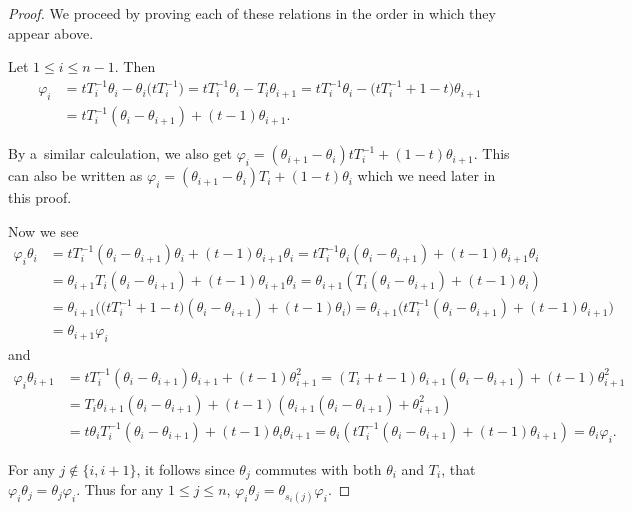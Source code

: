\documentclass[pdftex]{sigma}
\numberwithin{equation}{section}
\theoremstyle{definition}
\begin{document}
\begin{proof}
We proceed by proving each of these relations in the order in which they appear above.

 Let $1 \leq i \leq n-1$. Then
\begin{align*}
 \varphi_i &= tT_i^{-1}\theta_i - \theta_i\bigl(tT_i^{-1}\bigr) = tT_i^{-1}\theta_i - T_i\theta_{i+1} = tT_i^{-1}\theta_i - \bigl(tT_i^{-1}+1-t\bigr)\theta_{i+1}\\
 &= tT_i^{-1}(\theta_i - \theta_{i+1}) + (t-1)\theta_{i+1}.
\end{align*}

By a~similar calculation, we also get
$ \varphi_i = (\theta_{i+1}-\theta_i)tT_i^{-1} + (1-t)\theta_{i+1}$.
This can also be written as
$ \varphi_i = (\theta_{i+1}-\theta_i)T_i + (1-t)\theta_i
$
which we need later in this proof.

Now we see
\begin{align*}
 \varphi_i\theta_i &= tT_i^{-1}(\theta_i-\theta_{i+1})\theta_i + (t-1)\theta_{i+1}\theta_i = tT_i^{-1}\theta_i(\theta_i-\theta_{i+1}) + (t-1)\theta_{i+1}\theta_i \\
 & = \theta_{i+1}T_i(\theta_i -\theta_{i+1}) + (t-1)\theta_{i+1}\theta_i
 = \theta_{i+1}( T_i(\theta_i-\theta_{i+1}) + (t-1)\theta_i ) \\
 & = \theta_{i+1}\bigl( \bigl(tT_i^{-1} + 1-t\bigr)(\theta_i -\theta_{i+1}) + (t-1)\theta_i \bigr) = \theta_{i+1} \bigl( tT_i^{-1}(\theta_i -\theta_{i+1}) + (t-1)\theta_{i+1}\bigr) \\
&= \theta_{i+1}\varphi_i
\end{align*}
and
\begin{align*}
 \varphi_i\theta_{i+1} &= tT_i^{-1}(\theta_i - \theta_{i+1})\theta_{i+1}+(t-1)\theta_{i+1}^{2} = (T_i+t-1)\theta_{i+1}(\theta_i-\theta_{i+1}) + (t-1)\theta_{i+1}^2 \\
 & = T_i\theta_{i+1}(\theta_i-\theta_{i+1}) + (t-1)\left( \theta_{i+1}(\theta_i-\theta_{i+1})+\theta_{i+1}^2 \right) \\
 &= t\theta_iT_i^{-1}(\theta_i - \theta_{i+1}) +(t-1)\theta_i\theta_{i+1} = \theta_i\left( tT_i^{-1}(\theta_i-\theta_{i+1}) +(t-1)\theta_{i+1} \right) = \theta_i\varphi_i.
\end{align*}

For any $j \notin \{i,i+1\}$, it follows since $\theta_j$ commutes with both $\theta_i$ and $T_i$, that
$
 \varphi_i\theta_j = \theta_j \varphi_i$.
Thus for any $1\leq j \leq n$,
$
 \varphi_i\theta_j = \theta_{s_i(j)}\varphi_i$.



\end{proof}
\end{document}
